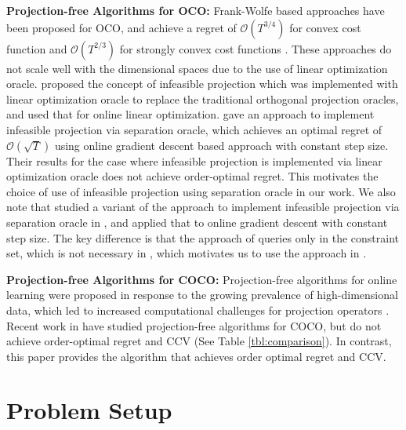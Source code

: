 \documentclass[twoside,11pt,]{article}
\newcommand{\C}[1]{\mathcal{#1}}
\renewcommand{\cite}[1]{\citep{#1}}
\begin{document}
\noindent \textbf{Projection-free Algorithms for OCO:} Frank-Wolfe based approaches have been proposed for OCO, and achieve a regret of $\C{O}(T^{3/4})$ for convex cost function \cite{pmlr-v37-daniely15,hazan2012projection} and $\C{O}(T^{2/3})$ for strongly convex cost functions \cite{kretzu2021revisiting}. These approaches do not scale well with the dimensional spaces due to the use of linear optimization oracle.  \citet{garber2021efficient} proposed the concept of infeasible projection which was implemented with linear optimization oracle to replace the traditional orthogonal projection oracles, and used that for online linear optimization.  \citet{garber2022new} gave an approach to implement infeasible projection via separation oracle, which achieves an optimal regret of $\C{O}(\sqrt{T})$ using online gradient descent based approach with constant step size. Their results for the case where infeasible projection is implemented via linear optimization oracle does not achieve order-optimal regret. This motivates the choice of use of infeasible projection using separation oracle in our work. We also note that \cite{pedramfar2024linearizable} studied a variant of the approach to implement infeasible projection via separation oracle in \cite{garber2022new}, and applied that to online gradient descent with constant step size. The key difference is that the approach of \cite{pedramfar2024linearizable} queries only in the constraint set, which is not necessary in \cite{garber2022new}, which motivates us to use the approach in \cite{pedramfar2024linearizable}. 




\noindent \textbf{Projection-free Algorithms for  COCO:} 
Projection-free algorithms for online learning were proposed in response to the growing prevalence of high-dimensional data, which led to increased computational challenges for projection operators \cite{hazan2012projection, hazan2020faster, garber2022new,lee2023projection}. Recent work in  \cite{garber2024projection} have studied  projection-free algorithms for  COCO, but do not achieve order-optimal regret and CCV (See Table \ref{tbl:comparison}). In contrast, this paper provides the algorithm that achieves order optimal regret and CCV. 





\section{Problem Setup}
\label{sec:prelim}
\end{document}
